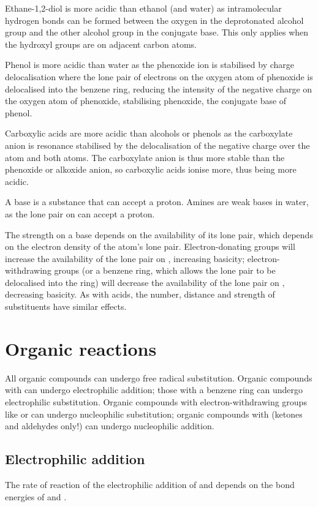 \documentclass[Chemistry.tex]{subfiles}
\begin{document}
Ethane-1,2-diol is more acidic than ethanol (and water) as intramolecular hydrogen bonds can be formed between the oxygen in the deprotonated alcohol group and the other alcohol group in the conjugate base. This only applies when the hydroxyl groups are on adjacent carbon atoms.

Phenol is more acidic than water as the phenoxide ion is stabilised by charge delocalisation where the lone pair of electrons on the oxygen atom of phenoxide is delocalised into the benzene ring, reducing the intensity of the negative charge on the oxygen atom of phenoxide, stabilising phenoxide, the conjugate base of phenol.

Carboxylic acids are more acidic than alcohols or phenols as the carboxylate anion is resonance stabilised by the delocalisation of the negative charge over the  atom and both  atoms. The carboxylate anion is thus more stable than the phenoxide or alkoxide anion, so carboxylic acids ionise more, thus being more acidic.

A base is a substance that can accept a proton. Amines are weak bases in water, as the lone pair on  can accept a proton.

The strength on a base depends on the availability of its lone pair, which depends on the electron density of the  atom's lone pair. Electron-donating groups will increase the availability of the lone pair on , increasing basicity; electron-withdrawing groups (or a benzene ring, which allows the lone pair to be delocalised into the ring) will decrease the availability of the lone pair on , decreasing basicity. As with acids, the number, distance and strength of substituents have similar effects.
\section{Organic reactions}
All organic compounds can undergo free radical substitution. Organic compounds with  can undergo electrophilic addition; those with a benzene ring can undergo electrophilic substitution. Organic compounds with electron-withdrawing groups like  or  can undergo nucleophilic substitution; organic compounds with  (ketones and aldehydes only!) can undergo nucleophilic addition.
\subsection{Electrophilic addition}
The rate of reaction of the electrophilic addition of  and  depends on the bond energies of  and .
\end{document}
